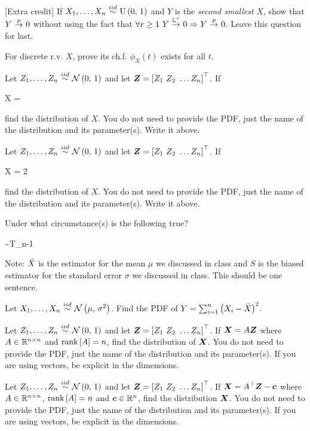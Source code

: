 \documentclass[12pt]{article}
\begin{document}
 [Extra credit] If $\Xoneton \iid \stduniform$ and $Y$ is the \emph{second smallest} $X$, show that $Y \convp 0$ without using the fact that $\forall r \geq 1~Y \convLp{r} 0 \Rightarrow Y \convp 0$. Leave this question for last. 


 For discrete r.v. $X$, prove its ch.f. $\phi_X(t)$ exists for all $t$.  



 Let $\Zoneton \iid \stdnormnot$ and let $\boldsymbol{Z} = \left[Z_1 ~ Z_2 ~ \ldots Z_n\right]^\top$. If 

\beqn
X = \hspace{300px}
\eeqn 

find the distribution of $X$. You do not need to provide the PDF, just the name of the distribution and its parameter(s). Write it above.  

 Let $\Zoneton \iid \stdnormnot$ and let $\boldsymbol{Z} = \left[Z_1 ~ Z_2 ~ \ldots Z_n\right]^\top$. If 

\beqn
X = 2\hspace{300px}
\eeqn

find the distribution of $X$. You do not need to provide the PDF, just the name of the distribution and its parameter(s). Write it above.  


 Under what circumstance(s) is the following true?

\beqn
{} \sim T_{n-1}
\eeqn 

Note: $\bar{X}$ is the estimator for the mean $\mu$ we discussed in class and $S$ is the biased estimator for the standard error $\sigma$ we discussed in class. This should be one sentence. 



 Let $\Xoneton \iid \normnot{\mu}{\sigsq}$. Find the PDF of $Y = \sum_{i=1}^n \left(X_i - \bar{X}\right)^2$.  

 Let $\Zoneton \iid \stdnormnot$ and let $\boldsymbol{Z} = \left[Z_1 ~ Z_2 ~ \ldots Z_n\right]^\top$. If $\boldsymbol{X} = A\boldsymbol{Z}$ where $A \in \mathbb{R}^{n \times n}$ and $\text{rank}\left[A\right] = n$, find the distribution of $\boldsymbol{X}$. You do not need to provide the PDF, just the name of the distribution and its parameter(s). If you are using vectors, be explicit in the dimensions.  

 Let $\Zoneton \iid \stdnormnot$ and let $\boldsymbol{Z} = \left[Z_1 ~ Z_2 ~ \ldots Z_n\right]^\top$. If $\boldsymbol{X} = A^\top \boldsymbol{Z} - \boldsymbol{c}$ where $A \in \mathbb{R}^{n \times n}$,  $\text{rank}\left[A\right] = n$ and $\boldsymbol{c} \in \mathbb{R}^n$, find the distribution  $\boldsymbol{X}$. You do not need to provide the PDF, just the name of the distribution and its parameter(s). If you are using vectors, be explicit in the dimensions.  
\end{document}
